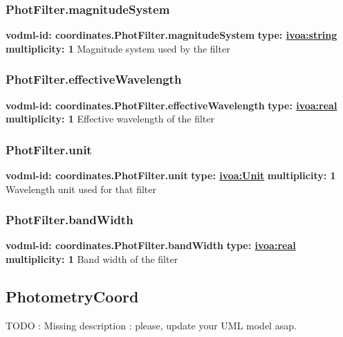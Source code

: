     \subsubsection{PhotFilter.magnitudeSystem}
      \textbf{vodml-id: coordinates.PhotFilter.magnitudeSystem} \newline
      \textbf{type: \hyperref[sect:ivoa]{ivoa:string}} \newline
      \textbf{multiplicity: 1} \newline 
      Magnitude system used by the filter

    \subsubsection{PhotFilter.effectiveWavelength}
      \textbf{vodml-id: coordinates.PhotFilter.effectiveWavelength} \newline
      \textbf{type: \hyperref[sect:ivoa]{ivoa:real}} \newline
      \textbf{multiplicity: 1} \newline 
      Effective wavelength of the filter

    \subsubsection{PhotFilter.unit}
      \textbf{vodml-id: coordinates.PhotFilter.unit} \newline
      \textbf{type: \hyperref[sect:ivoa]{ivoa:Unit}} \newline
      \textbf{multiplicity: 1} \newline 
      Wavelength unit used for that filter

    \subsubsection{PhotFilter.bandWidth}
      \textbf{vodml-id: coordinates.PhotFilter.bandWidth} \newline
      \textbf{type: \hyperref[sect:ivoa]{ivoa:real}} \newline
      \textbf{multiplicity: 1} \newline 
      Band width of the filter

  \subsection{PhotometryCoord}
  \label{sect:coordinates.PhotometryCoord}
    TODO : Missing description : please, update your UML model asap.

